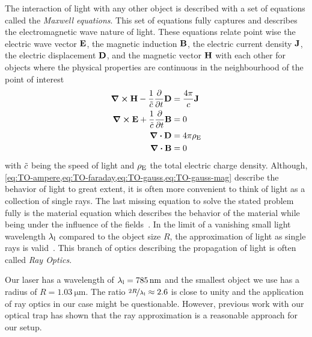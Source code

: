 The interaction of light with any other object is described with a set of 
equations called the \emph{Maxwell equations}. This set of equations fully 
captures and describes the electromagnetic wave nature of light. These 
equations relate point wise the electric wave vector $\vb{E}$, the magnetic 
induction $\vb{B}$, the electric current density $\vb{J}$, the electric 
displacement $\vb{D}$, and the magnetic vector $\vb{H}$ with each other for 
objects where the physical properties are continuous in the neighbourhood of 
the point of interest~\cite{Born1980Ch1}
\begin{subequations}
  \begin{align}
    \curl{\vb{H}} - \frac{1}{\tilde{c}}\pdv{t}\vb{D} 
    &=\frac{4\pi}{c}\vb{J} \label{eq:TO-ampere} \\
    \curl{\vb{E}} + \frac{1}{\tilde{c}}\pdv{t}\vb{B} &=  0
    \label{eq:TO-faraday} \\
    \div{\vb{D}} &= 4\pi\rho_{\mathrm{E}}
    \label{eq:TO-gauss} \\
    \div{\vb{B}} &= 0
    \label{eq:TO-gauss-mag}
  \end{align}
\end{subequations}
with $\tilde{c}$ being the speed of light and $\rho_{\mathrm{E}}$ the total 
electric charge density. Although, 
\cref{eq:TO-ampere,eq:TO-faraday,eq:TO-gauss,eq:TO-gauss-mag} describe the 
behavior of light to great extent, it is often more convenient to think of 
light as a collection of single rays. The last missing equation to solve the 
stated problem fully is the material equation which describes the behavior of the 
material while being under the influence of the fields~\cite{Born1980Ch1}. In 
the limit of a vanishing small light wavelength $\lambda_{\mathrm{l}}$ compared to the object 
size $R$, the approximation of light as single rays is 
valid~\cite{Born1980Ch3}. This branch of optics describing the propagation of 
light is often called \emph{Ray Optics}.

Our laser has a wavelength of $\lal=\SI{785}{\nm}$ and the smallest object we 
use has a radius of $R=\SI{1.03}{\um}$. The ratio $\nicefrac{2R}{\lambda_{\mathrm{l}}}\approx 
2.6$ is close to unity and the application of ray optics in our case might be 
questionable. However, previous work with our optical trap
\cite{Lakaemper2015,Lamprecht2016,Lamprecht2017} has shown that the ray 
approximation is a reasonable approach for our setup.



